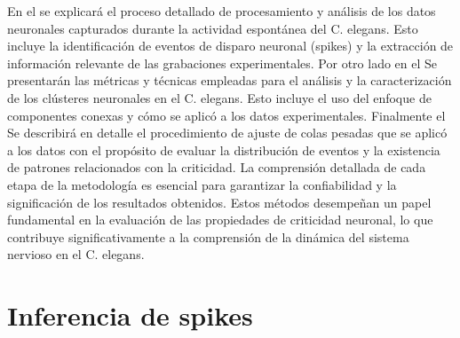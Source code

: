 En el   se explicará el proceso detallado de procesamiento y análisis de los datos neuronales capturados durante la actividad espontánea del C. elegans. Esto incluye la identificación de eventos de disparo neuronal (spikes) y la extracción de información relevante de las grabaciones experimentales. Por otro lado en el  Se presentarán las métricas y técnicas empleadas para el análisis y la caracterización de los clústeres neuronales en el C. elegans. Esto incluye el uso del enfoque de componentes conexas y cómo se aplicó a los datos experimentales. Finalmente el  Se describirá en detalle el procedimiento de ajuste de colas pesadas que se aplicó a los datos con el propósito de evaluar la distribución de eventos y la existencia de patrones relacionados con la criticidad. La comprensión detallada de cada etapa de la metodología es esencial para garantizar la confiabilidad y la significación de los resultados obtenidos. Estos métodos desempeñan un papel fundamental en la evaluación de las propiedades de criticidad neuronal, lo que contribuye significativamente a la comprensión de la dinámica del sistema nervioso en el C. elegans.




\section{Inferencia de spikes}\label{sec:inferencia_spikes}

